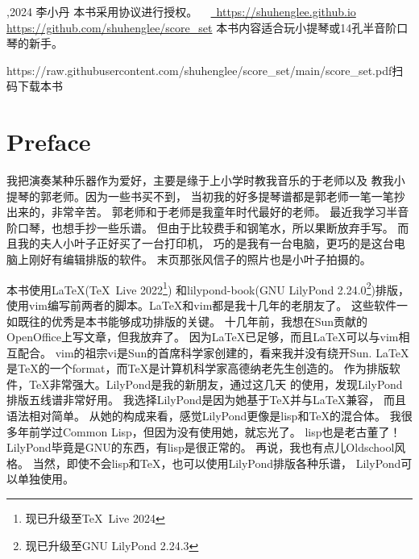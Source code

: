 \documentclass[a4paper,twoside]{memoir}
\begin{document}
\marktrue
\multimarktrue

\maketitle
\subtitlepage

\thispagestyle{empty}
{\obeylines\parindent=0pt\smallskip
{},2024 李小丹
本书采用\ccby 协议进行授权。
\ \myemail
\href{https://shuhenglee.github.io}%
{\ https://shuhenglee.github.io}
\href{https://github.com/shuhenglee/score\_set}%
{\kern-4pt\faGithub https://github.com/shuhenglee/score\_set}
\bigskip
本书内容适合玩小提琴或14孔半音阶口琴的新手。\bigskip}

\noindent\printbookver
\vfill
\hfill\theqr{\faGithub}%
{https://raw.githubusercontent.com/shuhenglee/score_set/main/score_set.pdf}{扫码下载本书}
\eject

\AddEverypageHook{\epcall}

\frontmatter

\chapter{Preface}
我把演奏某种乐器作为爱好，主要是缘于上小学时教我音乐的于老师以及
教我小提琴的郭老师。因为一些书买不到，
当初我的好多提琴谱都是郭老师一笔一笔抄出来的，非常辛苦。
郭老师和于老师是我童年时代最好的老师。
最近我学习半音阶口琴，也想手抄一些乐谱。
但由于比较费手和钢笔水，所以果断放弃手写。
而且我的夫人小叶子正好买了一台打印机，
巧的是我有一台电脑，更巧的是这台电脑上刚好有编辑排版的软件。
末页那张风信子的照片也是小叶子拍摄的。

本书使用\LaTeX (\TeX\ Live 2022\footnote{现已升级至\TeX\ Live 2024})
和lilypond-book(GNU LilyPond 2.24.0\footnote{现已升级至GNU LilyPond 2.24.3})排版，
使用vim编写前两者的脚本。\LaTeX 和vim都是我十几年的老朋友了。
这些软件一如既往的优秀是本书能够成功排版的关键。
十几年前，我想在Sun贡献的OpenOffice上写文章，但我放弃了。
因为\LaTeX 已足够，而且\LaTeX 可以与vim相互配合。
vim的祖宗vi是Sun的首席科学家创建的，看来我并没有绕开Sun.
\LaTeX 是\TeX 的一个format，而\TeX 是计算机科学家高德纳老先生创造的。
作为排版软件，\TeX 非常强大。LilyPond是我的新朋友，通过这几天
的使用，发现LilyPond排版五线谱非常好用。
我选择LilyPond是因为她基于\TeX 并与\LaTeX 兼容，
而且语法相对简单。
从她的构成来看，感觉LilyPond更像是lisp和\TeX 的混合体。
我很多年前学过Common Lisp，但因为没有使用她，就忘光了。
lisp也是老古董了！LilyPond毕竟是GNU的东西，有lisp是很正常的。
再说，我也有点儿Oldschool风格。
当然，即使不会lisp和\TeX ，也可以使用LilyPond排版各种乐谱，
LilyPond可以单独使用。
\end{document}
